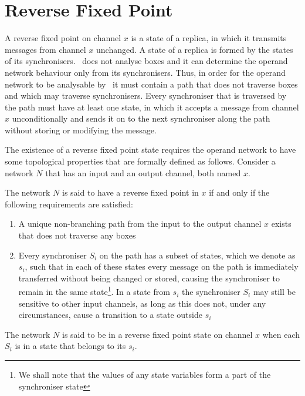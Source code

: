     \section{Reverse Fixed Point\label{rfp}}
A reverse fixed point on channel $x$ is a state of a replica, in which it transmits messages from channel $x$ unchanged. A state of a replica is formed by the states of its synchronisers. \ak\ does not analyse boxes and it can determine the operand network behaviour only from its synchronisers. Thus, in order for the operand network to be analysable by \ak\, it must contain a path that does not traverse boxes and which may traverse synchronisers. Every synchroniser that is traversed by the path must have at least one state, in which it accepts a message from channel $x$ unconditionally and sends it on to the next synchroniser along the path without storing or modifying the message.

The existence of a reverse fixed point state requires the operand network to have some topological properties that are formally defined as follows. Consider a network $N$ that has an input and an output channel, both named $x$.

\begin{definition} The network $N$ is said to have a reverse fixed point in $x$ if and only if the following requirements are satisfied:

\begin{enumerate}
\item A unique non-branching path from the input to the output channel $x$ exists that does not traverse any boxes

\item Every synchroniser $S_i$ on the path has a subset of states, which we denote as $s_i$, such that in each of these states every message on the path is immediately transferred without being changed or stored, causing the synchroniser to remain in the same state\footnote{We shall note that the values of any state variables form a part of the synchroniser state}. In a state from $s_i$ the synchroniser $S_i$ may still be sensitive to other input channels, as long as this does not, under any circumstances, cause a transition to a state outside $s_i$
\end{enumerate}
The network $N$ is said to be in a reverse fixed point state on channel $x$ when each $S_i$ is in a state that belongs to its $s_i$.
\end{definition}



